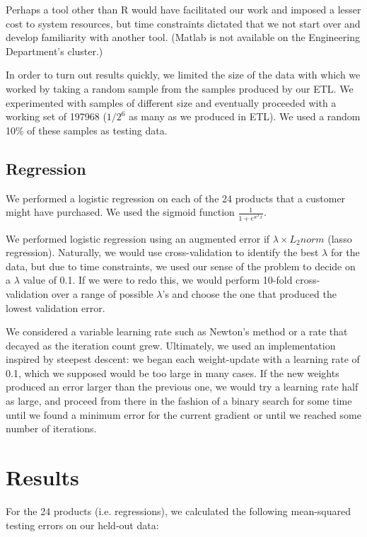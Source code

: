 \documentclass{report}
\begin{document}
Perhaps a tool other than R would have facilitated our work and imposed a lesser cost to system resources, but time constraints dictated that we not start over and develop familiarity with another tool. (Matlab is not available on the Engineering Department's cluster.)

In order to turn out results quickly, we limited the size of the data with which we worked by taking a random sample from the samples produced by our ETL. We experimented with samples of different size and eventually proceeded with a working set of 197968 ($1/2^6$ as many as we produced in ETL). We used a random 10\% of these samples as testing data.

\subsection{Regression}

We performed a logistic regression on each of the 24 products that a customer might have purchased. We used the sigmoid function $\frac{1}{1+e^{w^Tx}}$.

We performed logistic regression using an augmented error if $\lambda \times L_2norm$ (lasso regression). Naturally, we would use cross-validation to identify the best $\lambda$ for the data, but due to time constraints, we used our sense of the problem to decide on a $\lambda$ value of 0.1. If we were to redo this, we would perform 10-fold cross-validation over a range of possible $\lambda$'s and choose the one that produced the lowest validation error.

We considered a variable learning rate such as Newton's method or a rate that decayed as the iteration count grew. Ultimately, we used an implementation inspired by steepest descent: we began each weight-update with a learning rate of 0.1, which we supposed would be too large in many cases. If the new weights produced an error larger than the previous one, we would try a learning rate half as large, and proceed from there in the fashion of a binary search for some time until we found a minimum error for the current gradient or until we reached some number of iterations.

\section{Results}

For the 24 products (i.e. regressions), we calculated the following mean-squared testing errors on our held-out data:
\end{document}
